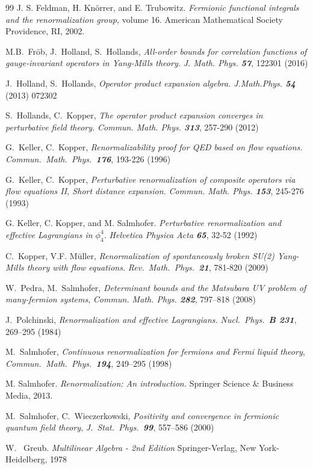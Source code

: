 \documentclass[12pt,twoside]{amsart}
\numberwithin{equation}{section}
\newcommand{\reftitel}[1]{{\sl #1}}
\begin{document}
\begin{thebibliography}{99}
J. S. Feldman, H. Kn\"orrer, and E. Trubowitz. \reftitel{Fermionic functional integrals and the renormalization group,} volume 16. American
Mathematical Society Providence, RI, 2002.

M.B.\ Fr\" ob, J.\ Holland, S.\ Hollands, \reftitel{All-order bounds for correlation functions of gauge-invariant operators in Yang-Mills theory.} {\em J. Math. Phys. \bf 57}, 122301 (2016)

 J.\ Holland, S.\ Hollands, \reftitel{Operator product expansion algebra.} {\em J.Math.Phys. \bf 54} (2013) 072302

S.\ Hollands, C.\ Kopper, \reftitel{The operator product expansion converges in perturbative field theory.} {\em Commun. Math. Phys. \bf 313}, 257-290 (2012)

G.\ Keller, C.\ Kopper, \reftitel{Renormalizability proof for QED based on flow equations.} {\em Commun.\ Math.\ Phys.\ \bf 176}, 193-226 (1996)

G.\ Keller, C.\ Kopper, \reftitel{Perturbative renormalization of composite operators via flow equations II, Short distance expansion.} {\em Commun. Math. Phys. \bf 153}, 245-276 (1993)

G. Keller, C. Kopper, and  M. Salmhofer. \reftitel{Perturbative renormalization and effective Lagrangians in $\phi^4_4$.} {\em Helvetica Physica Acta \bf 65}, 32-52 (1992)

C.\ Kopper, V.F. M\" uller,
\reftitel{Renormalization of spontaneously broken SU(2) Yang-Mills theory with flow equations.}
 {\em Rev.\ Math.\ Phys.\ \bf 21}, 781-820 (2009) 

W.\ Pedra, M.\ Salmhofer,
\reftitel{Determinant bounds and the Matsubara UV problem of many-fermion systems},
{\em Commun. Math. Phys. \bf 282}, 797--818 (2008)

J.\ Polchinski, 
\reftitel{Renormalization and effective Lagrangians.}
{\em Nucl.\ Phys.\ \bf B 231}, 269--295 (1984) 

M.\ Salmhofer, \reftitel{Continuous renormalization for fermions
and Fermi liquid theory}, {\em Commun.\ Math.\ Phys.\
\bf 194},  249--295 (1998)

M. Salmhofer. \reftitel{Renormalization: An introduction.} Springer Science \& Business Media, 2013.

M.\ Salmhofer, C.\ Wieczerkowski, 
\reftitel{Positivity and convergence in fermionic quantum field theory}, {\em J.\ Stat.\ Phys.\ \bf 99}, 557--586 (2000)

W. \ Greub. \reftitel{Multilinear Algebra - 2nd Edition} Springer-Verlag, New York-Heidelberg, 1978

\end{thebibliography}
\end{document}

